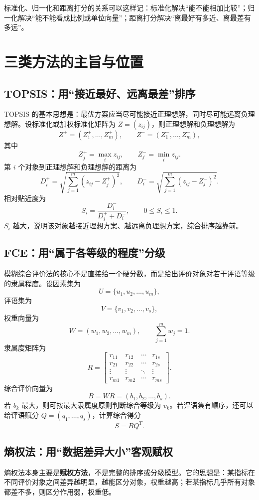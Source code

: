 \documentclass[UTF8,zihao=-4]{ctexart}
\begin{document}
\begin{tcolorbox}
标准化、归一化和距离打分的关系可以这样记：标准化解决“能不能相加比较”；归一化解决“能不能看成比例或单位向量”；距离打分解决“离最好有多近、离最差有多远”。
\end{tcolorbox}

\section{三类方法的主旨与位置}
\subsection{TOPSIS：用“接近最好、远离最差”排序}
TOPSIS 的基本思想是：最优方案应当尽可能接近正理想解，同时尽可能远离负理想解。设标准化或加权标准化矩阵为 $Z=(z_{ij})$，则正理想解和负理想解为
\[
Z^+=(Z^+_1,\ldots,Z^+_m),\qquad Z^-=(Z^-_1,\ldots,Z^-_m),
\]
其中
\[
Z^+_j=\max_i z_{ij},\qquad Z^-_j=\min_i z_{ij}.
\]
第 $i$ 个对象到正理想解和负理想解的距离为
\[
D_i^+=\sqrt{\sum_{j=1}^m (z_{ij}-Z_j^+)^2},\qquad
D_i^-=\sqrt{\sum_{j=1}^m (z_{ij}-Z_j^-)^2}.
\]
相对贴近度为
\[
S_i=\frac{D_i^-}{D_i^+ + D_i^-},\qquad 0\le S_i\le 1.
\]
$S_i$ 越大，说明该对象越接近理想方案、越远离负理想方案，综合排序越靠前。

\subsection{FCE：用“属于各等级的程度”分级}
模糊综合评价法的核心不是直接给一个硬分数，而是给出评价对象对若干评语等级的隶属程度。设因素集为
\[
U=\{u_1,u_2,\ldots,u_m\},
\]
评语集为
\[
V=\{v_1,v_2,\ldots,v_s\},
\]
权重向量为
\[
W=(w_1,w_2,\ldots,w_m),\qquad \sum_{j=1}^m w_j=1.
\]
隶属度矩阵为
\[
R=\begin{bmatrix}
r_{11}&r_{12}&\cdots&r_{1s}\\
r_{21}&r_{22}&\cdots&r_{2s}\\
\vdots&\vdots&\ddots&\vdots\\
r_{m1}&r_{m2}&\cdots&r_{ms}
\end{bmatrix}.
\]
综合评价向量为
\[
B=WR=(b_1,b_2,\ldots,b_s).
\]
若 $b_k$ 最大，则可按最大隶属度原则判断综合等级为 $v_k$。若评语集有顺序，还可以给评语赋分 $Q=(q_1,\ldots,q_s)$，计算综合得分
\[
S=BQ^T.
\]

\subsection{熵权法：用“数据差异大小”客观赋权}
熵权法本身主要是\textbf{赋权方法}，不是完整的排序或分级模型。它的思想是：某指标在不同评价对象之间差异越明显，越能区分对象，权重越高；若某指标几乎所有对象都差不多，则区分作用弱，权重低。
\end{document}

